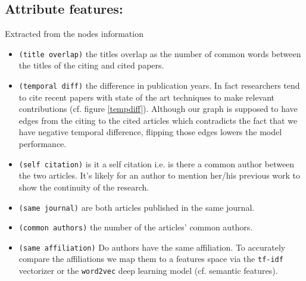 \documentclass{acmsiggraph}
\begin{document}
\subsection{Attribute features:}
Extracted from the nodes information
\begin{itemize}
\item \texttt{(title overlap)}  the titles overlap as the number of common words between the titles of the citing and cited papers.
\item \texttt{(temporal diff)} the difference in publication years. In fact researchers tend to cite recent papers with state of the art techniques to make relevant contributions (cf. figure \ref{tempdiff}). Although our graph is supposed to have edges from the citing to the cited articles which contradicts the fact that we have negative temporal difference, flipping those edges lowers the model performance.
\item \texttt{(self citation)} is it a self citation i.e. is there a common author between the two articles. It's likely for an author to mention her/his previous work to show the continuity of the research.
\item \texttt{(same journal)} are both articles published in the same journal.
\item \texttt{(common authors)} the number of the articles' common authors.
\item \texttt{(same affiliation)} Do authors have the same affiliation. To accurately compare the affiliations we map them to a features space via the \texttt{tf-idf} vectorizer or the \texttt{word2vec} deep learning model (cf. semantic features).
\end{itemize}
\end{document}
